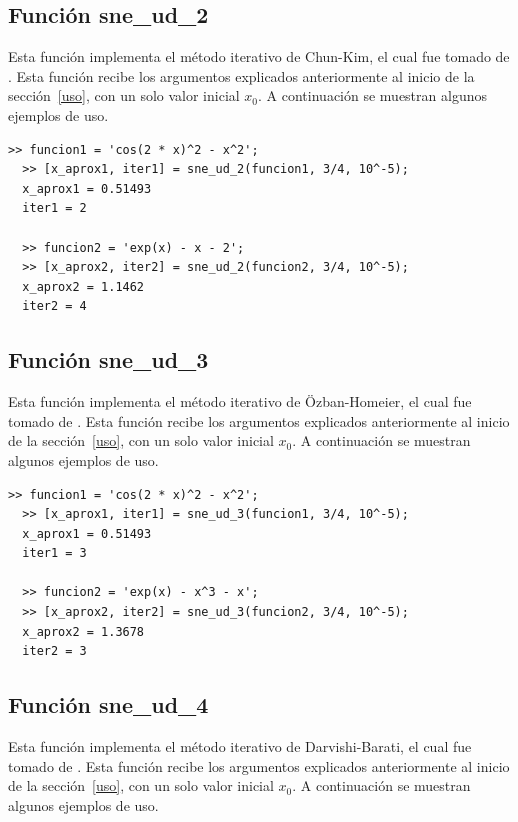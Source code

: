 \documentclass[12pt]{article}
\begin{document}
\subsection{Función sne\_ud\_2}
Esta función implementa el método iterativo de Chun-Kim, el cual fue tomado de \cite{kiran2015performance}. Esta función recibe los argumentos explicados anteriormente al inicio de la sección~\ref{uso}, con un solo valor inicial $x_{0}$. A continuación se muestran algunos ejemplos de uso.

\begin{minipage}{\linewidth}
\begin{lstlisting}[frame = single]
  >> funcion1 = 'cos(2 * x)^2 - x^2';
  >> [x_aprox1, iter1] = sne_ud_2(funcion1, 3/4, 10^-5);
  x_aprox1 = 0.51493
  iter1 = 2

  >> funcion2 = 'exp(x) - x - 2';
  >> [x_aprox2, iter2] = sne_ud_2(funcion2, 3/4, 10^-5);
  x_aprox2 = 1.1462
  iter2 = 4

\end{lstlisting}
\end{minipage}

\subsection{Función sne\_ud\_3}
Esta función implementa el método iterativo de Özban-Homeier, el cual fue tomado de \cite{kiran2015performance}. Esta función recibe los argumentos explicados anteriormente al inicio de la sección~\ref{uso}, con un solo valor inicial $x_{0}$. A continuación se muestran algunos ejemplos de uso.

\begin{minipage}{\linewidth}
\begin{lstlisting}[frame = single]
  >> funcion1 = 'cos(2 * x)^2 - x^2';
  >> [x_aprox1, iter1] = sne_ud_3(funcion1, 3/4, 10^-5);
  x_aprox1 = 0.51493
  iter1 = 3

  >> funcion2 = 'exp(x) - x^3 - x';
  >> [x_aprox2, iter2] = sne_ud_3(funcion2, 3/4, 10^-5);
  x_aprox2 = 1.3678
  iter2 = 3

\end{lstlisting}
\end{minipage}

\subsection{Función sne\_ud\_4}
Esta función implementa el método iterativo de Darvishi-Barati, el cual fue tomado de \cite{kiran2015performance}. Esta función recibe los argumentos explicados anteriormente al inicio de la sección~\ref{uso}, con un solo valor inicial $x_{0}$. A continuación se muestran algunos ejemplos de uso.
\end{document}
